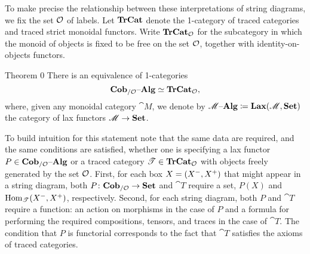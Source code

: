 \documentclass[11pt,oneside,article]{memoir}
\begin{document}
To make precise the relationship between these interpretations of string diagrams, we fix the set $\mathcal{O}$ of labels.  Let $\mathbf{TrCat}$ denote the 1-category of traced categories and traced strict monoidal functors.  Write $\mathbf{TrCat}_{\mathcal{O}}$ for the subcategory in which the monoid of objects is fixed to be free on the set $\mathcal{O}$, together with identity-on-objects functors.  
\begin{named}{Theorem 0}
   \label{th:traced is cob alg}
   There is an equivalence of 1-categories
   \begin{equation}
      \label{eq:single_fiber_tr}
      \mathbf{Cob}_{/\mathcal{O}}{\text \textendash}\mathbf{Alg}\simeq\mathbf{TrCat}_{\mathcal{O}},
   \end{equation}
   where, given any monoidal category $\cat{M}$, we denote by $\mathscr{M}{\text \textendash}\mathbf{Alg}\coloneqq\mathbf{Lax}(\mathscr{M},\mathbf{Set})$ the category of lax functors $\mathscr{M}\to\mathbf{Set}$.  
\end{named}
To build intuition for this statement note that the same data are required, and the same conditions are satisfied, whether one is specifying a lax functor $P\in\mathbf{Cob}_{/\mathcal{O}}{\text \textendash}\mathbf{Alg}$ or a traced category $\mathscr{T}\in\mathbf{TrCat}_{\mathcal{O}}$ with objects freely generated by the set $\mathcal{O}$.  First, for each box $X=(X^-,X^+)$ that might appear in a string diagram, both $P\colon\mathbf{Cob}_{/\mathcal{O}}\to\mathbf{Set}$ and $\cat{T}$ require a set, $P(X)$ and $\operatorname{Hom}_{\mathscr{T}}(X^-,X^+)$, respectively.  Second, for each string diagram, both $P$ and $\cat{T}$ require a function: an action on morphisms in the case of $P$ and a formula for performing the required compositions, tensors, and traces in the case of $\cat{T}$. The condition that $P$ is functorial corresponds to the fact that $\cat{T}$ satisfies the axioms of traced categories.
\end{document}
